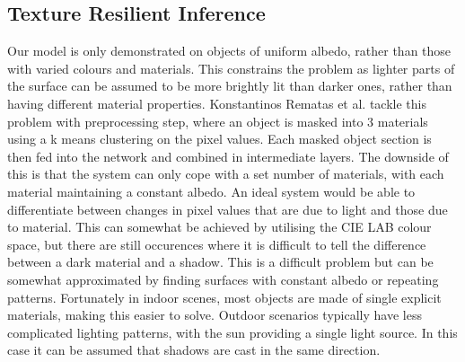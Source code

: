 \documentclass[ %
                    author={Gavin Parker},
                supervisor={Dr. Neill Campbell},
                    degree={MEng},
                     title={Deep Siamese Networks for Illumination Estimation from Stereo Images},
                  subtitle={},
                      type={research},
                      year={2018} ]{dissertation}
\begin{document}
\subsection{Texture Resilient Inference}
Our model is only demonstrated on objects of uniform albedo, rather than those with varied colours and materials. This constrains the problem as lighter parts of the surface can be assumed to be more brightly lit than darker ones, rather than having different material properties. Konstantinos Rematas et al. tackle this problem with  preprocessing step, where an object is masked into 3 materials using a k means clustering on the pixel values. Each masked object section is then fed into the network and combined in intermediate layers. The downside of this is that the system can only cope with a set number of materials, with each material maintaining a constant albedo. An ideal system would be able to differentiate between changes in pixel values that are due to light and those due to material. This can somewhat be achieved by utilising the CIE LAB colour space, but there are still occurences where it is difficult to tell the difference between a dark material and a shadow. This is a difficult problem but can be somewhat approximated by finding surfaces with constant albedo or repeating patterns. Fortunately in indoor scenes, most objects are made of single explicit materials, making this easier to solve. Outdoor scenarios typically have less complicated lighting patterns, with the sun providing a single light source. In this case it can be assumed that shadows are cast in the same direction.
\end{document}
